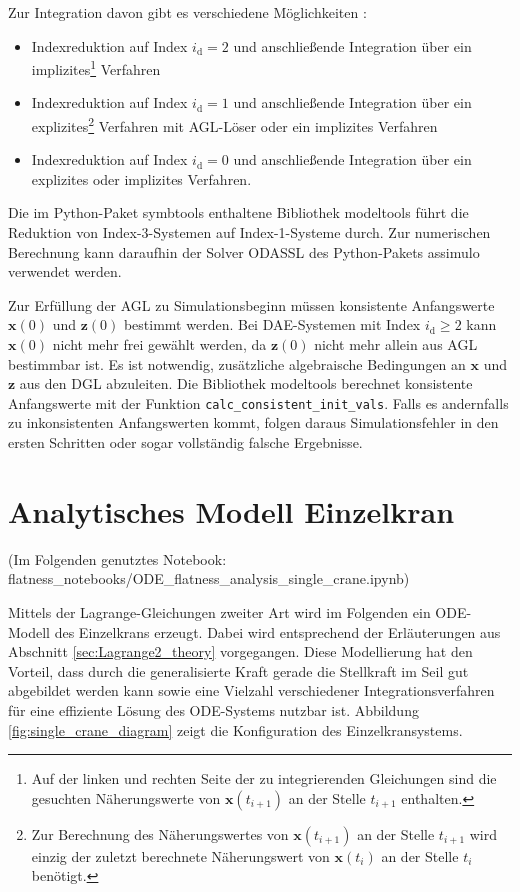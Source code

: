 Zur Integration davon gibt es verschiedene Möglichkeiten \cite[Kap. 8]{ModSimSkript}: 
\begin{itemize}
\item  Indexreduktion auf Index $i_\mathrm{d} = 2$ und anschließende Integration über ein implizites\footnote{Auf der linken und rechten Seite der zu integrierenden Gleichungen sind die gesuchten Näherungswerte von $\mathbf{x}(t_{i+1})$ an der Stelle $t_{i+1}$ enthalten.} Verfahren
\item Indexreduktion auf Index $i_\mathrm{d} = 1$ und anschließende Integration über ein explizites\footnote{Zur Berechnung des Näherungswertes von $\mathbf{x}(t_{i+1})$ an der Stelle $t_{i+1}$ wird einzig der zuletzt berechnete Näherungswert von $\mathbf{x}(t_{i})$ an der Stelle $t_{i}$ benötigt.} Verfahren mit AGL-Löser oder ein implizites Verfahren
\item Indexreduktion auf Index  $i_\mathrm{d} = 0$ und anschließende Integration über ein explizites oder implizites Verfahren.
\end{itemize}
Die im Python-Paket symbtools \cite{symbtools} enthaltene Bibliothek modeltools führt die Reduktion von Index-3-Systemen auf Index-1-Systeme durch. Zur numerischen Berechnung kann daraufhin der Solver ODASSL des Python-Pakets assimulo \cite{assimulo} verwendet werden.

Zur Erfüllung der AGL zu Simulationsbeginn müssen konsistente Anfangswerte $\mathbf{x}(0)$ und $\mathbf{z}(0)$ bestimmt werden. Bei DAE-Systemen mit Index $i_\mathrm{d} \geq 2$  kann $\mathbf{x}(0)$ nicht mehr frei gewählt werden, da $\mathbf{z}(0)$ nicht mehr allein aus AGL bestimmbar ist. Es ist notwendig, zusätzliche algebraische Bedingungen an $\mathbf{x}$ und $\mathbf{z}$ aus den DGL abzuleiten. Die Bibliothek modeltools berechnet konsistente Anfangswerte mit der Funktion \texttt{calc\_consistent\_init\_vals}. Falls es andernfalls zu inkonsistenten Anfangswerten kommt, folgen daraus Simulationsfehler in den ersten Schritten oder sogar vollständig falsche Ergebnisse. \cite[S.207]{JanschekSystementwurf}

\section{Analytisches Modell Einzelkran}
(Im Folgenden genutztes Notebook: flatness\_notebooks/ODE\_flatness\_analysis\_single\_crane.ipynb)

Mittels der Lagrange-Gleichungen zweiter Art wird im Folgenden ein ODE-Modell des Einzelkrans erzeugt. Dabei wird entsprechend der Erläuterungen aus Abschnitt \ref{sec:Lagrange2_theory} vorgegangen. Diese Modellierung hat den Vorteil, dass durch die generalisierte Kraft gerade die Stellkraft im Seil gut abgebildet werden kann sowie eine Vielzahl verschiedener Integrationsverfahren für eine effiziente Lösung des ODE-Systems nutzbar ist. Abbildung \ref{fig:single_crane_diagram} zeigt die Konfiguration des Einzelkransystems.

